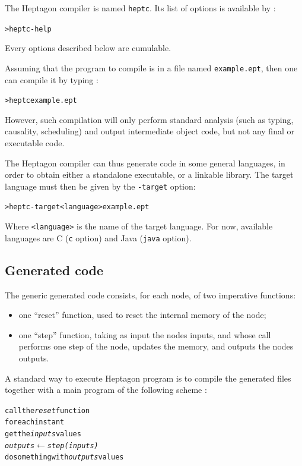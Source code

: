 \documentclass[a4paper]{article}
\begin{document}
The Heptagon compiler is named \texttt{heptc}. Its list of options is available by
:

\begin{alltt}
> heptc -help
\end{alltt}

Every options described below are cumulable.

Assuming that the program to compile is in a file named \texttt{example.ept},
then one can compile it by typing :

\begin{alltt}
> heptc example.ept
\end{alltt}

However, such compilation will only perform standard analysis (such as typing,
causality, scheduling) and output intermediate object code, but not any final or
executable code.

The Heptagon compiler can thus generate code in some general languages, in order
to obtain either a standalone executable, or a linkable library. The target
language must then be given by the \texttt{-target} option:

\begin{alltt}
> heptc -target <language> example.ept
\end{alltt}

Where \texttt{<language>} is the name of the target language. For now, available
languages are C (\texttt{c} option) and Java (\texttt{java} option).

\subsection{Generated code}
\label{sec:generated-code}

The generic generated code consists, for each node, of two imperative functions:
\begin{itemize}
\item one ``reset'' function, used to reset the internal memory of the node;
\item one ``step'' function, taking as input the nodes inputs, and whose call
  performs one step of the node, updates the memory, and outputs the nodes
  outputs.
\end{itemize}

A standard way to execute Heptagon program is to compile the generated files
together with a main program of the following scheme :

\begin{alltt}
call the \textit{reset} function
for each instant
   get the \textit{inputs} values
   \textit{outputs} \(\leftarrow\) \textit{step(inputs)}
   do something with \textit{outputs} values
\end{alltt}
\end{document}
